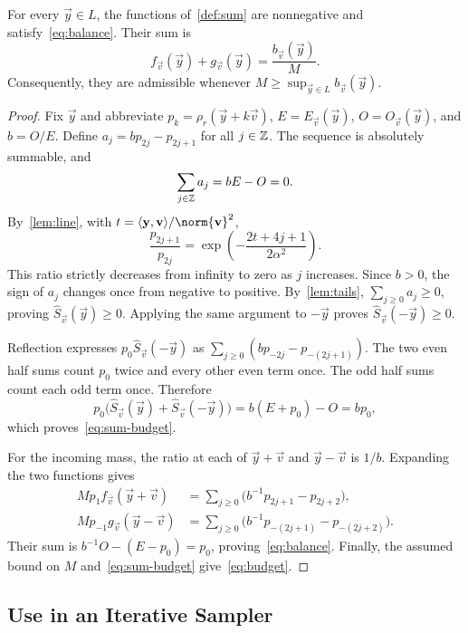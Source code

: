 \begin{theorem}
\label{thm:construction}
For every $\vec y\in L$, the functions of~\cref{def:sum} are nonnegative and satisfy~\cref{eq:balance}. Their sum is
\begin{equation}
\label{eq:sum-budget}
 f_{\vec v}(\vec y)+g_{\vec v}(\vec y)=\frac{b_{\vec v}(\vec y)}M.
\end{equation}
Consequently, they are admissible whenever $M\ge\sup_{\vec y\in L}b_{\vec v}(\vec y)$.
\end{theorem}
\begin{proof}
Fix $\vec y$ and abbreviate $p_k=\rho_r(\vec y+k\vec v)$, $E=E_{\vec v}(\vec y)$, $O=O_{\vec v}(\vec y)$, and $b=O/E$. Define $a_j=bp_{2j}-p_{2j+1}$ for all $j\in\mathbb{Z}$. The sequence is absolutely summable, and
\[
 \sum_{j\in\mathbb{Z}}a_j=bE-O=0.
\]
By~\cref{lem:line}, with $t=\inner{\vec y}{\vec v}/\norm{\vec v}^2$,
\[
 \frac{p_{2j+1}}{p_{2j}}=\exp\!\left(-\frac{2t+4j+1}{2\alpha^2}\right).
\]
This ratio strictly decreases from infinity to zero as $j$ increases. Since $b>0$, the sign of $a_j$ changes once from negative to positive. By~\cref{lem:tails}, $\sum_{j\ge0}a_j\ge0$, proving $\widehat S_{\vec v}(\vec y)\ge0$. Applying the same argument to $-\vec y$ proves $\widehat S_{\vec v}(-\vec y)\ge0$.

Reflection expresses $p_0\widehat S_{\vec v}(-\vec y)$ as $\sum_{j\ge0}(bp_{-2j}-p_{-(2j+1)})$. The two even half sums count $p_0$ twice and every other even term once. The odd half sums count each odd term once. Therefore
\[
 p_0\bigl(\widehat S_{\vec v}(\vec y)+\widehat S_{\vec v}(-\vec y)\bigr)
 =b(E+p_0)-O=bp_0,
\]
which proves~\cref{eq:sum-budget}.

For the incoming mass, the ratio at each of $\vec y+\vec v$ and $\vec y-\vec v$ is $1/b$. Expanding the two functions gives
\begin{align*}
 Mp_1 f_{\vec v}(\vec y+\vec v)
 &=\sum_{j\ge0}\bigl(b^{-1}p_{2j+1}-p_{2j+2}\bigr),\\
 Mp_{-1}g_{\vec v}(\vec y-\vec v)
 &=\sum_{j\ge0}\bigl(b^{-1}p_{-(2j+1)}-p_{-(2j+2)}\bigr).
\end{align*}
Their sum is $b^{-1}O-(E-p_0)=p_0$, proving~\cref{eq:balance}. Finally, the assumed bound on $M$ and~\cref{eq:sum-budget} give~\cref{eq:budget}.
\end{proof}

\subsection{Use in an Iterative Sampler}

